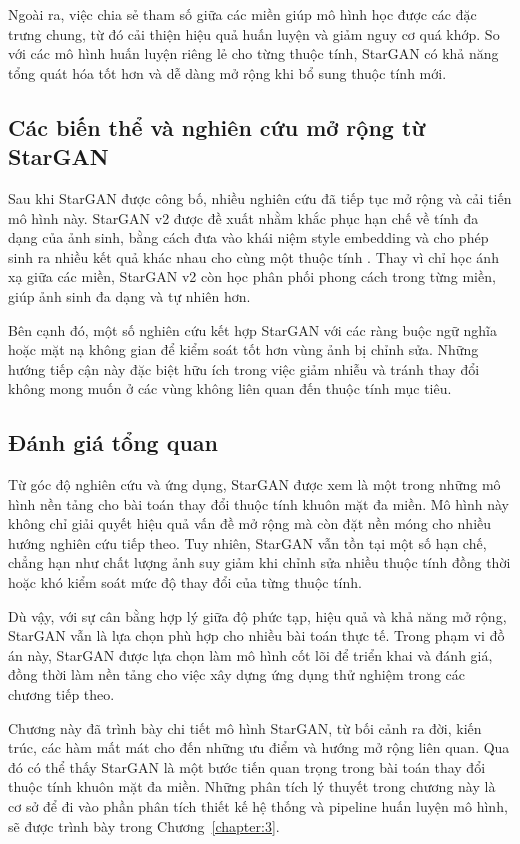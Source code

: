 \documentclass[../DoAn.tex]{subfiles}
\begin{document}
Ngoài ra, việc chia sẻ tham số giữa các miền giúp mô hình học được các đặc trưng chung, từ đó cải thiện hiệu quả huấn luyện và giảm nguy cơ quá khớp. So với các mô hình huấn luyện riêng lẻ cho từng thuộc tính, StarGAN có khả năng tổng quát hóa tốt hơn và dễ dàng mở rộng khi bổ sung thuộc tính mới.

\subsection{Các biến thể và nghiên cứu mở rộng từ StarGAN}

Sau khi StarGAN được công bố, nhiều nghiên cứu đã tiếp tục mở rộng và cải tiến mô hình này. StarGAN v2 được đề xuất nhằm khắc phục hạn chế về tính đa dạng của ảnh sinh, bằng cách đưa vào khái niệm style embedding và cho phép sinh ra nhiều kết quả khác nhau cho cùng một thuộc tính \cite{Choi2020StarGANv2}. Thay vì chỉ học ánh xạ giữa các miền, StarGAN v2 còn học phân phối phong cách trong từng miền, giúp ảnh sinh đa dạng và tự nhiên hơn.

Bên cạnh đó, một số nghiên cứu kết hợp StarGAN với các ràng buộc ngữ nghĩa hoặc mặt nạ không gian để kiểm soát tốt hơn vùng ảnh bị chỉnh sửa. Những hướng tiếp cận này đặc biệt hữu ích trong việc giảm nhiễu và tránh thay đổi không mong muốn ở các vùng không liên quan đến thuộc tính mục tiêu.

\subsection{Đánh giá tổng quan}

Từ góc độ nghiên cứu và ứng dụng, StarGAN được xem là một trong những mô hình nền tảng cho bài toán thay đổi thuộc tính khuôn mặt đa miền. Mô hình này không chỉ giải quyết hiệu quả vấn đề mở rộng mà còn đặt nền móng cho nhiều hướng nghiên cứu tiếp theo. Tuy nhiên, StarGAN vẫn tồn tại một số hạn chế, chẳng hạn như chất lượng ảnh suy giảm khi chỉnh sửa nhiều thuộc tính đồng thời hoặc khó kiểm soát mức độ thay đổi của từng thuộc tính.

Dù vậy, với sự cân bằng hợp lý giữa độ phức tạp, hiệu quả và khả năng mở rộng, StarGAN vẫn là lựa chọn phù hợp cho nhiều bài toán thực tế. Trong phạm vi đồ án này, StarGAN được lựa chọn làm mô hình cốt lõi để triển khai và đánh giá, đồng thời làm nền tảng cho việc xây dựng ứng dụng thử nghiệm trong các chương tiếp theo.


Chương này đã trình bày chi tiết mô hình StarGAN, từ bối cảnh ra đời, kiến trúc, các hàm mất mát cho đến những ưu điểm và hướng mở rộng liên quan. Qua đó có thể thấy StarGAN là một bước tiến quan trọng trong bài toán thay đổi thuộc tính khuôn mặt đa miền. Những phân tích lý thuyết trong chương này là cơ sở để đi vào phần phân tích thiết kế hệ thống và pipeline huấn luyện mô hình, sẽ được trình bày trong Chương~\ref{chapter:3}.
\end{document}
